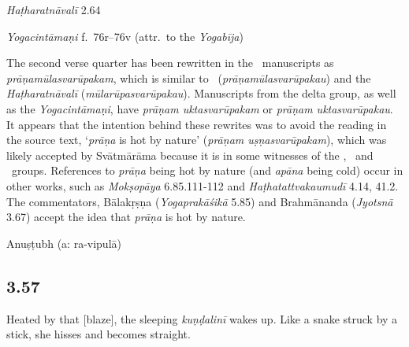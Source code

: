 \begin{ekdosis}
\begin{testimonia}[hp03_056]
\emph{Haṭharatnāvalī} 2.64
\begin{versinnote}
\end{versinnote}

\emph{Yogacintāmaṇi} f.~76r–76v (attr.~to the \emph{Yogabīja})
\begin{versinnote}
\end{versinnote}

\end{testimonia}

\begin{philcomm}[hp03_056]
The second verse quarter has been rewritten in the \textalpha\ manuscripts as \emph{prāṇamūlasvarūpakam}, which is similar to \etaOne\ (\emph{prāṇamūlasvarūpakau}) and the \emph{Haṭharatnāvalī} (\emph{mūlarūpasvarūpakau}). Manuscripts from the delta group, as well as the \emph{Yogacintāmaṇi}, have \emph{prāṇam uktasvarūpakam} or \emph{prāṇam uktasvarūpakau}. It appears that the intention behind these rewrites was to avoid the reading in the source text, `\textit{prāṇa} is hot by nature' (\emph{prāṇam uṣṇasvarūpakam}), which was likely accepted by Svātmārāma because it is in some witnesses of the \textbeta, \textgamma\ and \textepsilon\ groups. References to \emph{prāṇa} being hot by nature (and \emph{apāna} being cold) occur in other works, such as \emph{Mokṣopāya} 6.85.111-112 and \emph{Haṭhatattvakaumudī} 4.14, 41.2. The commentators, Bālakṛṣṇa (\emph{Yogaprakāśikā} 5.85) and Brahmānanda (\emph{Jyotsnā} 3.67) accept the idea that \emph{prāṇa} is hot by nature.
%

\end{philcomm}

\begin{metre}[hp03_056]
Anuṣṭubh (a: ra-vipulā)
\end{metre}

\subsection*{3.57}
\begin{translation}[hp03_057]
Heated by that [blaze], the sleeping \emph{kuṇḍalinī} wakes up. Like a snake struck by a stick, she hisses and becomes straight.
\end{translation}


\end{ekdosis}
